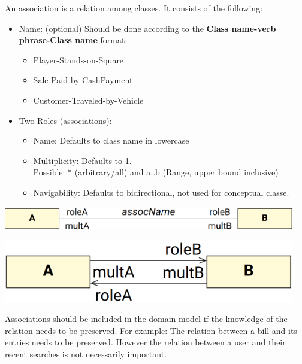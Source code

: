 \documentclass[
../../Software_Engineering_Summary.tex,
]
{subfiles}
\begin{document}
\begin{defbox}
    An association is a relation among classes. It consists of the following:
    \begin{itemize}
        \item Name: (optional) Should be done according to the \textbf{Class name-verb phrase-Class name} format:
        \begin{itemize}
            \item \color{teal}Player-\color{magenta}Stands-on\color{teal}-Square
            \item \color{teal}Sale-\color{magenta}Paid-by\color{teal}-CashPayment
            \item \color{teal}Customer-\color{magenta}Traveled-by\color{teal}-Vehicle
        \end{itemize}
        \item Two Roles (associations):
        \begin{itemize}
            \item Name: Defaults to class name in lowercase
            \item Multiplicity: Defaults to 1. \\ Possible: * (arbitrary/all) and a..b (Range, upper bound inclusive)
            \item Navigability: Defaults to bidirectional, not used for conceptual classe.
        \end{itemize}
    \end{itemize}
    \begin{minipage}
        [m]{0.6\textwidth}
        \centering
        \includegraphics[width=0.95\textwidth]{Pics/UMLClassesAssociations.png}
    \end{minipage}
    \hfill
    \begin{minipage}
        [m]{0.4\textwidth}
        \centering
        \includegraphics[width=0.95\textwidth]{Pics/UMLClassesDirectional.png}
    \end{minipage}

    Associations should be included in the domain model if the knowledge of the relation needs to be preserved. For example: The relation between a bill and its entries needs to be preserved. However the relation between a user and their recent searches is not necessarily important.
\end{defbox}
\end{document}
